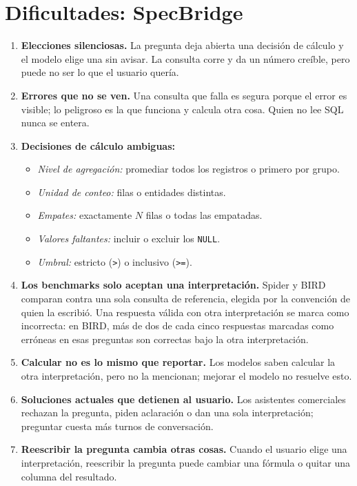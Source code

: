 \documentclass[11pt,a4paper]{article}
\begin{document}
\section{Dificultades: SpecBridge}
\begin{enumerate}
  \item \textbf{Elecciones silenciosas.} La pregunta deja abierta una decisión de cálculo y el modelo elige una sin avisar. La consulta corre y da un número creíble, pero puede no ser lo que el usuario quería.
  \item \textbf{Errores que no se ven.} Una consulta que falla es segura porque el error es visible; lo peligroso es la que funciona y calcula otra cosa. Quien no lee SQL nunca se entera.
  \item \textbf{Decisiones de cálculo ambiguas:}
  \begin{itemize}
    \item \textit{Nivel de agregación:} promediar todos los registros o primero por grupo.
    \item \textit{Unidad de conteo:} filas o entidades distintas.
    \item \textit{Empates:} exactamente $N$ filas o todas las empatadas.
    \item \textit{Valores faltantes:} incluir o excluir los \texttt{NULL}.
    \item \textit{Umbral:} estricto (\texttt{>}) o inclusivo (\texttt{>=}).
  \end{itemize}
  \item \textbf{Los benchmarks solo aceptan una interpretación.} Spider y BIRD comparan contra una sola consulta de referencia, elegida por la convención de quien la escribió. Una respuesta válida con otra interpretación se marca como incorrecta: en BIRD, más de dos de cada cinco respuestas marcadas como erróneas en esas preguntas son correctas bajo la otra interpretación.
  \item \textbf{Calcular no es lo mismo que reportar.} Los modelos saben calcular la otra interpretación, pero no la mencionan; mejorar el modelo no resuelve esto.
  \item \textbf{Soluciones actuales que detienen al usuario.} Los asistentes comerciales rechazan la pregunta, piden aclaración o dan una sola interpretación; preguntar cuesta más turnos de conversación.
  \item \textbf{Reescribir la pregunta cambia otras cosas.} Cuando el usuario elige una interpretación, reescribir la pregunta puede cambiar una fórmula o quitar una columna del resultado.
\end{enumerate}
\end{document}
